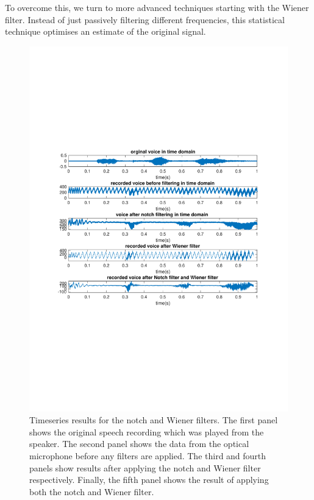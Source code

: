 \documentclass[paper-main.tex]{subfiles}
\begin{document}
To overcome this, we turn to more advanced techniques starting with the Wiener filter. Instead of just passively filtering different frequencies, this statistical technique optimises an estimate of the original signal. 







\begin{figure}
\begin{center}
\includegraphics[width=\textwidth,trim={1cm 8.2cm 1 8.3cm},clip]{figures/timeSeriesNotchWiener.pdf}
\end{center}
\caption{\label{fig:timeNotchWiener}
Timeseries results for the notch and Wiener filters. 
The first panel shows the original speech recording which was played from the speaker. 
The second panel shows the data from the optical microphone before any filters are applied. 
The third and fourth panels show results after applying the notch and Wiener filter respectively. 
Finally, the fifth panel shows the result of applying both the notch and Wiener filter. 
}
\end{figure}
\end{document}
